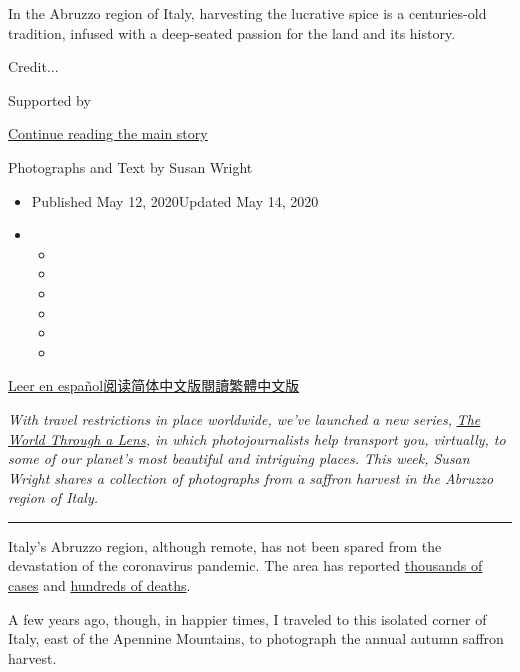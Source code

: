 In the Abruzzo region of Italy, harvesting the lucrative spice is a
centuries-old tradition, infused with a deep-seated passion for the land
and its history.

Credit...

Supported by

\protect\hyperlink{after-sponsor}{Continue reading the main story}

Photographs and Text by Susan Wright

\begin{itemize}
\item
  Published May 12, 2020Updated May 14, 2020
\item
  \begin{itemize}
  \item
  \item
  \item
  \item
  \item
  \item
  \end{itemize}
\end{itemize}

\href{https://www.nytimes.com/es/2020/05/15/espanol/azafran-italia-fotos.html}{Leer
en
español}\href{https://cn.nytimes.com/travel/20200701/italy-saffron/}{阅读简体中文版}\href{https://cn.nytimes.com/travel/20200701/italy-saffron/zh-hant/}{閱讀繁體中文版}

\emph{With travel restrictions in place worldwide, we've launched a new
series,}
\href{https://www.nytimes.com/column/the-world-through-a-lens}{\emph{The
World Through a Lens}}\emph{, in which photojournalists help transport
you, virtually, to some of our planet's most beautiful and intriguing
places. This week, Susan Wright shares a collection of photographs from
a saffron harvest in the Abruzzo region of Italy.}

\begin{center}\rule{0.5\linewidth}{\linethickness}\end{center}

Italy's Abruzzo region, although remote, has not been spared from the
devastation of the coronavirus pandemic. The area has reported
\href{https://www.nytimes.com/interactive/2020/world/europe/italy-coronavirus-cases.html}{thousands
of cases} and
\href{https://www.nytimes.com/2020/04/24/world/europe/italy-coronavirus-home-isolation.html}{hundreds
of deaths}.

A few years ago, though, in happier times, I traveled to this isolated
corner of Italy, east of the Apennine Mountains, to photograph the
annual autumn saffron harvest.


